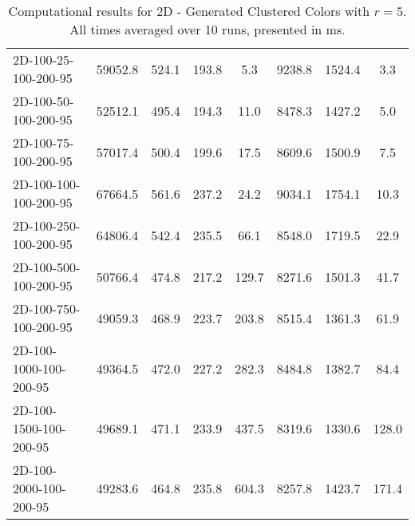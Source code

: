 \documentclass{article}
\begin{document}
\begin{table}[h]
\begin{center}
\begin{tabular}{|l||c|c|c|c|c|c|c|}
            \hline
            2D-100-25-100-200-95          & 59052.8 & 524.1     & 193.8      & 5.3         & 9238.8   & 1524.4    & 3.3        \\
            2D-100-50-100-200-95          & 52512.1 & 495.4     & 194.3      & 11.0        & 8478.3   & 1427.2    & 5.0        \\
            2D-100-75-100-200-95          & 57017.4 & 500.4     & 199.6      & 17.5        & 8609.6   & 1500.9    & 7.5        \\
            2D-100-100-100-200-95         & 67664.5 & 561.6     & 237.2      & 24.2        & 9034.1   & 1754.1    & 10.3       \\
            2D-100-250-100-200-95         & 64806.4 & 542.4     & 235.5      & 66.1        & 8548.0   & 1719.5    & 22.9       \\
            2D-100-500-100-200-95         & 50766.4 & 474.8     & 217.2      & 129.7       & 8271.6   & 1501.3    & 41.7       \\
            2D-100-750-100-200-95         & 49059.3 & 468.9     & 223.7      & 203.8       & 8515.4   & 1361.3    & 61.9       \\
            2D-100-1000-100-200-95        & 49364.5 & 472.0     & 227.2      & 282.3       & 8484.8   & 1382.7    & 84.4       \\
            2D-100-1500-100-200-95        & 49689.1 & 471.1     & 233.9      & 437.5       & 8319.6   & 1330.6    & 128.0      \\
            2D-100-2000-100-200-95        & 49283.6 & 464.8     & 235.8      & 604.3       & 8257.8   & 1423.7    & 171.4      \\
            \hline
        \end{tabular}
    \end{center}
    \caption{Computational results for 2D - Generated Clustered Colors with $r=5$. All times averaged over 10 runs, presented in ms.}
\end{table}
\restoregeometry
\end{document}
